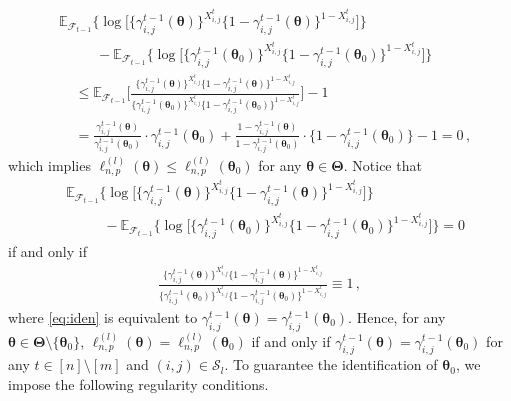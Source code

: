 \documentclass[12pt]{article}
\newcommand{\bTheta}{\boldsymbol \Theta}
\newcommand{\btheta}{\boldsymbol \theta}
\newcommand{\0}{{\bf 0}}
\begin{document}
\begin{align*}
&\mathbb{E}_{\mathcal{F}_{t-1}}\big\{\log\big[\{\gamma_{i,j}^{t-1}(\btheta)\}^{X_{i,j}^t}\{1-\gamma_{i,j}^{t-1}(\btheta)\}^{1-X_{i,j}^t}\big]\big\}\\
&~~~~~~~~~~~~-\mathbb{E}_{\mathcal{F}_{t-1}}\big\{\log\big[\{\gamma_{i,j}^{t-1}(\btheta_0)\}^{X_{i,j}^t}\{1-\gamma_{i,j}^{t-1}(\btheta_0)\}^{1-X_{i,j}^t}\big]\big\}\\
&~~~~~\leq\mathbb{E}_{\mathcal{F}_{t-1}}\Bigg[\frac{\{\gamma_{i,j}^{t-1}(\btheta)\}^{X_{i,j}^t}\{1-\gamma_{i,j}^{t-1}(\btheta)\}^{1-X_{i,j}^t}}{\{\gamma_{i,j}^{t-1}(\btheta_0)\}^{X_{i,j}^t}\{1-\gamma_{i,j}^{t-1}(\btheta_0)\}^{1-X_{i,j}^t}}\Bigg]-1\\
&~~~~~=\frac{\gamma_{i,j}^{t-1}(\btheta)}{\gamma_{i,j}^{t-1}(\btheta_0)}\cdot\gamma_{i,j}^{t-1}(\btheta_0)+\frac{1-\gamma_{i,j}^{t-1}(\btheta)}{1-\gamma_{i,j}^{t-1}(\btheta_0)}\cdot\{1-\gamma_{i,j}^{t-1}(\btheta_0)\}-1=0\,,
\end{align*}
which implies
$
\ell_{n,p}^{(l)}(\btheta)\leq\ell_{n,p}^{(l)}(\btheta_0)$ for any $\btheta\in\bTheta$. Notice that 
\begin{align*}
&\mathbb{E}_{\mathcal{F}_{t-1}}\big\{\log\big[\{\gamma_{i,j}^{t-1}(\btheta)\}^{X_{i,j}^t}\{1-\gamma_{i,j}^{t-1}(\btheta)\}^{1-X_{i,j}^t}\big]\big\}\\
&~~~~~~~~~~~~-\mathbb{E}_{\mathcal{F}_{t-1}}\big\{\log\big[\{\gamma_{i,j}^{t-1}(\btheta_0)\}^{X_{i,j}^t}\{1-\gamma_{i,j}^{t-1}(\btheta_0)\}^{1-X_{i,j}^t}\big]\big\}=0
\end{align*}
if and only if 
\begin{align}\label{eq:iden}
\frac{\{\gamma_{i,j}^{t-1}(\btheta)\}^{X_{i,j}^t}\{1-\gamma_{i,j}^{t-1}(\btheta)\}^{1-X_{i,j}^t}}{\{\gamma_{i,j}^{t-1}(\btheta_0)\}^{X_{i,j}^t}\{1-\gamma_{i,j}^{t-1}(\btheta_0)\}^{1-X_{i,j}^t}}\equiv1\,,
\end{align}
where \eqref{eq:iden} is equivalent to $\gamma_{i,j}^{t-1}(\btheta)=\gamma_{i,j}^{t-1}(\btheta_0)$. Hence, for any $\btheta\in\bTheta\setminus\{\btheta_0\}$, $\ell_{n,p}^{(l)}(\btheta)=\ell_{n,p}^{(l)}(\btheta_0)$ if and only if $\gamma_{i,j}^{t-1}(\btheta)=\gamma_{i,j}^{t-1}(\btheta_0)$ for any $t\in[n]\setminus[m]$ and $(i,j)\in\mathcal{S}_l$. To guarantee the identification of $\btheta_0$, we impose the following regularity conditions.
\end{document}
